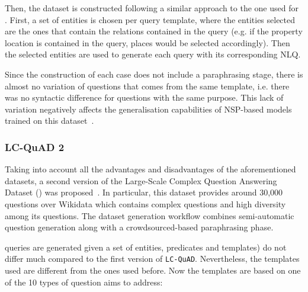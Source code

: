 Then, the dataset is constructed following a similar approach to the one used for \LCQuADone{}. 
First, a set of entities is chosen per query template, where the entities selected are the ones 
that contain the relations contained in the query (e.g. if the property location is contained 
in the query, places would be selected accordingly). Then the selected entities are used to 
generate each \SPARQL{} query with its corresponding NLQ. 

Since the construction of each case does not include a paraphrasing stage, there is almost no 
variation of questions that comes from the same template, i.e. there was no syntactic 
difference for questions with the same purpose. This lack of variation negatively affects the 
generalisation capabilities of NSP-based models trained on this dataset~\cite{qa:BerantL14}.

\subsubsection{LC-QuAD 2}
\label{cap2:theoFrame/qakg/benchmarkDatasets/lcquad2}
Taking into account all the advantages and disadvantages of the aforementioned datasets, a 
second version of the Large-Scale Complex Question Answering Dataset (\LCQuADtwo{}) was 
proposed~\cite{dataset:lcquad2-DubeyBA019}. In particular, this dataset provides around 30,000 
questions over Wikidata which contains complex questions and high diversity among its questions. 
The dataset generation workflow combines semi-automatic question generation along with a 
crowdsourced-based paraphrasing phase.

\SPARQL{} queries are generated given a set of entities, predicates and templates) do not differ 
much compared to the first version of \texttt{LC-QuAD}. Nevertheless, the \SPARQL{} templates used 
are different from the ones used before. Now the templates are based on one of the 10 types of 
question \LCQuADtwo{} aims to address:

